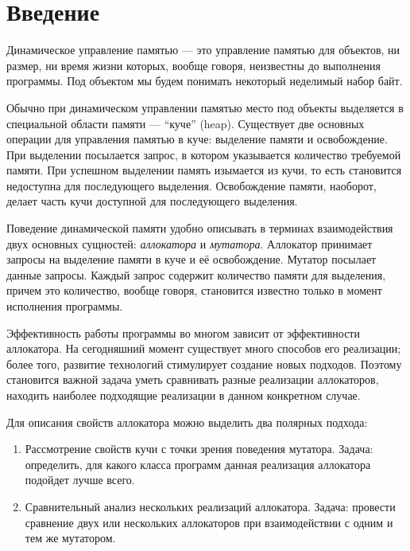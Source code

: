\section*{Введение}

   Динамическое управление памятью --- это управление памятью для объектов, ни размер, ни время жизни которых, вообще говоря, неизвестны до
   выполнения программы. Под объектом мы будем понимать некоторый неделимый набор байт.
   
   Обычно при динамическом управлении памятью место под объекты выделяется в специальной области памяти --- \textquotedblleft куче\textquotedblright
   (heap). Существует
   две основных операции для управления памятью в куче: выделение памяти и освобождение. При выделении посылается запрос, в котором указывается количество
   требуемой памяти. При успешном выделении память изымается из кучи, то есть становится недоступна для последующего выделения.
   Освобождение памяти, наоборот, делает часть кучи доступной для последующего выделения.
   
   Поведение динамической памяти удобно описывать в терминах взаимодействия двух основных сущностей: \emph{аллокатора} и \emph{мутатора}. Аллокатор принимает запросы на выделение
   памяти в куче и её освобождение. Мутатор посылает данные запросы. Каждый запрос содержит количество памяти для выделения, причем 
   это количество, вообще говоря, становится известно только в момент исполнения программы.
   
   Эффективность работы программы во многом зависит от эффективности аллокатора. На сегодняшний момент существует много способов его 
   реализации; более того, развитие технологий стимулирует создание новых подходов. Поэтому становится важной задача уметь сравнивать разные
   реализации аллокаторов, находить наиболее подходящие реализации в данном конкретном случае.
   
   Для описания свойств аллокатора можно выделить два полярных подхода:
   \begin{enumerate}
   \item Рассмотрение свойств кучи с точки зрения поведения мутатора. Задача: определить, для какого класса программ данная реализация аллокатора 
   подойдет лучше всего. 
   \item Сравнительный анализ нескольких реализаций аллокатора. Задача: провести сравнение двух или нескольких аллокаторов при взаимодействии с
   одним и тем же мутатором.
   \end{enumerate}
   
